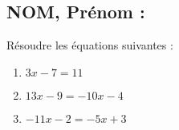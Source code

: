 \documentclass[a4paper,11pt,exos]{nsi} %
\begin{document}
\subsection*{NOM, Prénom : \dotfill} 


\maketitle




\begin{exercice}
Résoudre les équations suivantes :
\begin{multicols}{3}
	\begin{enumerate}
		\item $3x-7=11$
	    \item $13x-9=-10x-4$
	    \item $-11x-2=-5x+3$
	\end{enumerate}
\end{multicols}

\end{exercice}

\end{document}
